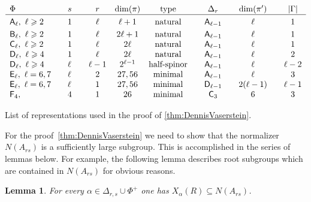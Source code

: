 \documentclass[11pt]{amsart}
\theoremstyle{plain}
\numberwithin{equation}{section}
\newtheorem{lemma}{Lemma}
\numberwithin{lemma}{section}
\theoremstyle{definition}
\theoremstyle{remark}
\newcommand{\rA}{\mathsf{A}}
\newcommand{\rB}{\mathsf{B}}
\newcommand{\rC}{\mathsf{C}}
\newcommand{\rD}{\mathsf{D}}
\newcommand{\rE}{\mathsf{E}}
\newcommand{\rF}{\mathsf{F}}
\begin{document}
\begin{table}[htb]
\[\begin{array}{l @{\qquad} l @{\qquad} c @{\quad} c @{\quad} c @{\qquad} c @{\qquad} c @{\qquad} c}
\Phi                                  & s    &r      & \mathrm{dim}(\pi) & \text{type} & \text{$\Delta_r$} & \mathrm{dim}(\pi') & |\Gamma|  \\ \hline\vphantom{\Bigl(}
\rA_\ell, \ \ell\geqslant 2           & 1    &\ell   & \ell+1         & \text{natural}       & \rA_{\ell-1}              & \ell           & 1  \\     
\rB_\ell, \ \ell\geqslant 2           & 1    &\ell   & 2\ell+1        & \text{natural}       & \rA_{\ell-1}              & \ell           & 1  \\     
\rC_\ell, \ \ell\geqslant 2           & 1    &\ell   & 2\ell          & \text{natural}       & \rA_{\ell-1}              & \ell           & 1  \\
\rD_\ell, \ \ell\geqslant 4           & 1    &\ell   & 2\ell          & \text{natural}       & \rA_{\ell-1}              & \ell           & 2  \\ 
\rD_\ell, \ \ell\geqslant 4           & \ell &\ell-1 & 2^{\ell-1}     & \text{half-spinor}   & \rA_{\ell-1}              & \ell           & \ell-2  \\
\rE_\ell, \ \ell=6, 7                 & \ell &2      & 27, 56         & \text{minimal}       & \rA_{\ell-1}              & \ell           & 3       \\ 
\rE_\ell, \ \ell=6, 7                 & \ell &1      & 27, 56         & \text{minimal}       & \rD_{\ell-1}              & 2(\ell-1)      & \ell-1 \\
\rF_4,                                & 4    & 1     & 26             & \text{minimal}       & \rC_{3}                   & 6              & 3 \end{array}\]
 \caption{List of representations used in the proof of \cref{thm:DennisVaserstein}.} \label{table:dv-reps}
\end{table}
For the proof~\cref{thm:DennisVaserstein} we need to show that the normalizer $N(A_{rs})$ is a sufficiently large subgroup.
This is accomplished in the series of lemmas below. For example, the following lemma describes root subgroups 
 which are contained in $N(A_{rs})$ for obvious reasons.
\begin{lemma}\label{lemma:dv-normal} 
For every $\alpha \in \Delta_{r, s} \cup \Phi^+ $ one has $X_\alpha(R) \subseteq N(A_{rs})$. \end{lemma}
\end{document}
